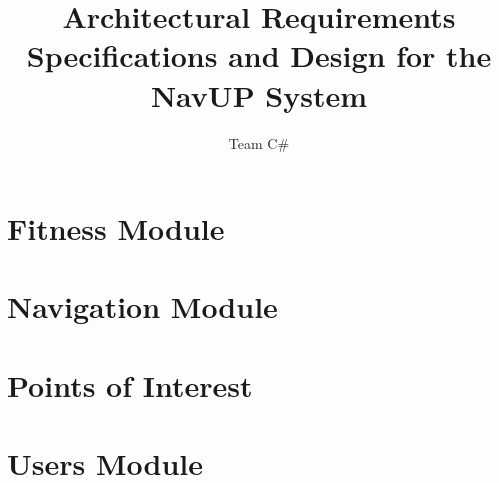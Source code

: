\documentclass[11pt]{article}
\author{Team C\#}
\title{Architectural Requirements Specifications and Design for the NavUP System}
\begin{document}
	\setlength{\parskip}{6pt}
	
	
	
	\tableofcontents
	
	\newpage

\section{Fitness Module}
    
    
\section{Navigation Module}
    

\section{Points of Interest}
    
    
\section{Users Module}
    
\end{document}
